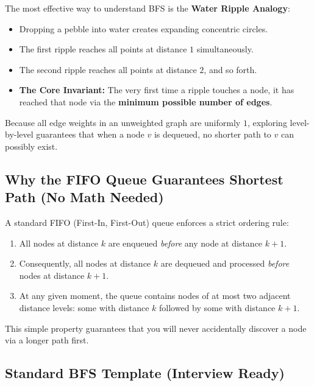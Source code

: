 \documentclass[10pt,journal,compsoc,onecolumn]{IEEEtran}
\begin{document}
The most effective way to understand BFS is the \textbf{Water Ripple Analogy}:
\begin{itemize}
    \item Dropping a pebble into water creates expanding concentric circles.
    \item The first ripple reaches all points at distance $1$ simultaneously.
    \item The second ripple reaches all points at distance $2$, and so forth.
    \item \textbf{The Core Invariant:} The very first time a ripple touches a node, it has reached that node via the \textbf{minimum possible number of edges}.
\end{itemize}

Because all edge weights in an unweighted graph are uniformly $1$, exploring level-by-level guarantees that when a node $v$ is dequeued, no shorter path to $v$ can possibly exist.

\subsection{Why the FIFO Queue Guarantees Shortest Path (No Math Needed)}

A standard FIFO (First-In, First-Out) queue enforces a strict ordering rule:
\begin{enumerate}
    \item All nodes at distance $k$ are enqueued \emph{before} any node at distance $k+1$.
    \item Consequently, all nodes at distance $k$ are dequeued and processed \emph{before} nodes at distance $k+1$.
    \item At any given moment, the queue contains nodes of at most two adjacent distance levels: some with distance $k$ followed by some with distance $k+1$.
\end{enumerate}
This simple property guarantees that you will never accidentally discover a node via a longer path first.

\subsection{Standard BFS Template (Interview Ready)}
\end{document}
